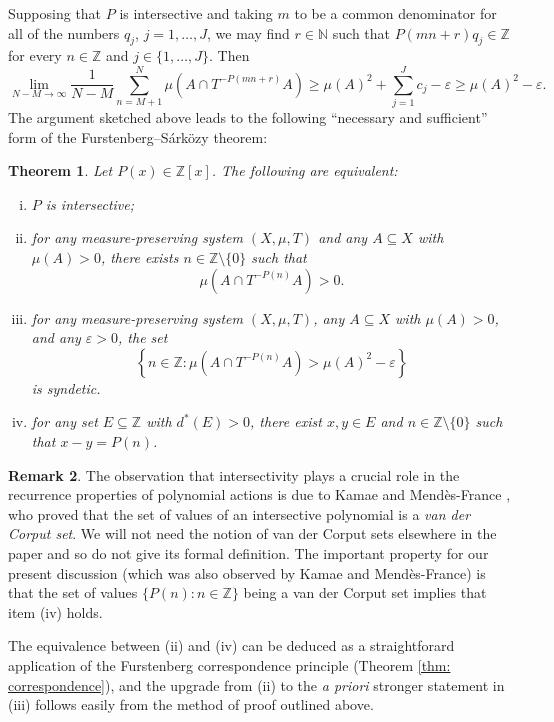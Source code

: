 \documentclass{amsart}
\newtheorem{theorem}{Theorem}[section]
\theoremstyle{definition}
\newtheorem{remark}[theorem]{Remark}
\numberwithin{equation}{section}
\newcommand{\N}{\mathbb{N}}
\newcommand{\Z}{\mathbb{Z}}
\newcommand{\eps}{\varepsilon}
\begin{document}
Supposing that $P$ is intersective and taking $m$ to be a common denominator for all of the numbers $q_j$, $j=1, \dots, J$, we may find $r \in \N$ such that $P(mn+r)q_j \in \Z$ for every $n \in \Z$ and $j \in \{1, \dots, J\}$.
Then
\begin{equation*}
    \lim_{N-M \to \infty} \frac{1}{N-M} \sum_{n=M+1}^N \mu(A \cap T^{-P(mn+r)}A) \ge \mu(A)^2 + \sum_{j=1}^J c_j - \eps \ge \mu(A)^2 - \eps.
\end{equation*}
The argument sketched above leads to the following ``necessary and sufficient'' form of the Furstenberg--S\'{a}rk\"{o}zy theorem:

\begin{theorem} \label{thm: necessary and sufficient FS}
    Let $P(x) \in \Z[x]$.
    The following are equivalent:
    \begin{enumerate}[(i)]
        \item $P$ is intersective;
        \item for any measure-preserving system $\left( X, \mu, T \right)$ and any $A \subseteq X$ with $\mu(A) > 0$, there exists $n \in \Z \setminus \{0\}$ such that
        \begin{equation*}
            \mu \left( A \cap T^{-P(n)}A \right) > 0.
        \end{equation*}
        \item for any measure-preserving system $\left( X, \mu, T \right)$, any $A \subseteq X$ with $\mu(A) > 0$, and any $\eps > 0$, the set
        \begin{equation*}
            \left\{ n \in \Z : \mu \left( A \cap T^{-P(n)}A \right) > \mu(A)^2 - \eps \right\}
        \end{equation*}
        is syndetic.
        \item for any set $E \subseteq \Z$ with $d^*(E) > 0$, there exist $x, y \in E$ and $n \in \Z \setminus \{0\}$ such that $x - y = P(n)$.
    \end{enumerate}
\end{theorem}

\begin{remark} \label{rem: necessary and sufficient FS}
    The observation that intersectivity plays a crucial role in the recurrence properties of polynomial actions is due to Kamae and Mend\`{e}s-France \cite{km}, who proved that the set of values of an intersective polynomial is a \emph{van der Corput set}.
    We will not need the notion of van der Corput sets elsewhere in the paper and so do not give its formal definition.
    The important property for our present discussion (which was also observed by Kamae and Mend\`{e}s-France) is that the set of values $\{P(n) : n \in \Z\}$ being a van der Corput set implies that item (iv) holds.

    The equivalence between (ii) and (iv) can be deduced as a straightforard application of the Furstenberg correspondence principle (Theorem \ref{thm: correspondence}), and the upgrade from (ii) to the \emph{a priori} stronger statement in (iii) follows easily from the method of proof outlined above.
\end{remark}
\end{document}
